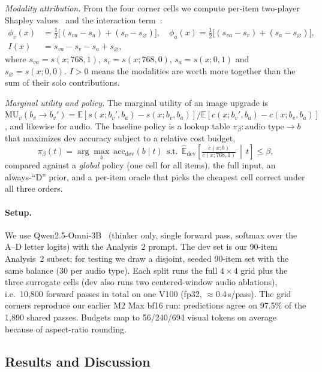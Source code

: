 \emph{Modality attribution.} From the four corner cells we compute per-item
two-player Shapley values~\citep{shapley1953value,lundberg2017shap} and the
interaction term~\citep{hessel2020emap}:
\begin{align}
\phi_v(x)&=\tfrac12\big[(s_{va}-s_{a})+(s_{v}-s_{\varnothing})\big],\quad
\phi_a(x)=\tfrac12\big[(s_{va}-s_{v})+(s_{a}-s_{\varnothing})\big],\nonumber\\
I(x)&=s_{va}-s_{v}-s_{a}+s_{\varnothing},
\end{align}
where $s_{va}=s(x;768,1)$, $s_v=s(x;768,0)$, $s_a=s(x;0,1)$ and
$s_\varnothing=s(x;0,0)$. $I>0$ means the modalities are worth more together
than the sum of their solo contributions.

\emph{Marginal utility and policy.} The marginal utility of an image upgrade
is $\mathrm{MU}_v(b_v\!\to\!b_v')=\mathbb{E}[s(x;b_v',b_a)-s(x;b_v,b_a)]/
\mathbb{E}[c(x;b_v',b_a)-c(x;b_v,b_a)]$, and likewise for audio. The baseline
policy is a lookup table $\pi_\beta:\text{audio type}\to b$ that maximizes dev
accuracy subject to a relative cost budget,
\begin{equation}
\pi_\beta(t)=\arg\max_{b}\ \widehat{\mathrm{acc}}_{\text{dev}}(b\mid t)
\ \ \text{s.t.}\ \ \widehat{\mathbb{E}}_{\text{dev}}\!\left[\tfrac{c(x;b)}{c(x;768,1)}\,\middle|\,t\right]\le\beta,
\end{equation}
compared against a \emph{global} policy (one cell for all items), the full
input, an always-``D'' prior, and a per-item oracle that picks the cheapest
cell correct under all three orders.

\paragraph{Setup.} We use Qwen2.5-Omni-3B~\citep{xu2025qwen25omni} (thinker
only, single forward pass, softmax over the A--D letter logits) with the
Analysis~2 prompt. The dev set is our 90-item Analysis~2 subset; for testing
we draw a disjoint, seeded 90-item set with the same balance (30 per audio
type). Each split runs the full $4\times4$ grid plus the three surrogate
cells (dev also runs two centered-window audio ablations), i.e.\ 10{,}800
forward passes in total on one V100 (fp32, $\approx$0.4\,s/pass). The grid
corners reproduce our earlier M2 Max bf16 run: predictions agree on 97.5\% of
the 1{,}890 shared passes. Budgets map to 56/240/694 visual tokens on average
because of aspect-ratio rounding.

\subsection{Results and Discussion}


